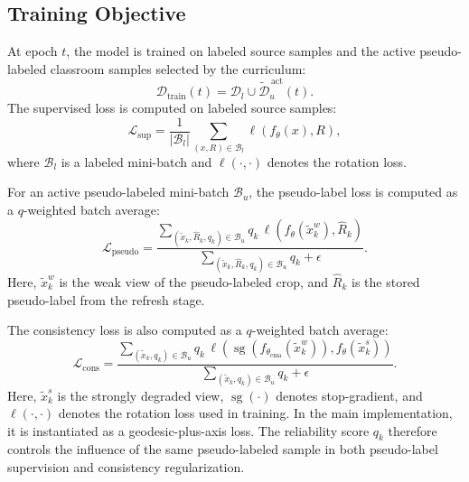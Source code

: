 \documentclass[preprint,12pt]{elsarticle}
\begin{document}
\subsection{Training Objective}
\label{sec:training_objective}

At epoch $t$, the model is trained on labeled source samples and the active pseudo-labeled classroom samples selected by the curriculum:
\begin{equation}
\mathcal{D}_{\mathrm{train}}(t)
=
\mathcal{D}_l
\cup
\tilde{\mathcal{D}}_u^{\,\mathrm{act}}(t).
\label{eq:trainset}
\end{equation}
The supervised loss is computed on labeled source samples:
\begin{equation}
\mathcal{L}_{\mathrm{sup}}
=
\frac{1}{|\mathcal{B}_l|}
\sum_{(x,R)\in\mathcal{B}_l}
\ell(f_\theta(x),R),
\label{eq:sup_loss}
\end{equation}
where $\mathcal{B}_l$ is a labeled mini-batch and $\ell(\cdot,\cdot)$ denotes the rotation loss.

For an active pseudo-labeled mini-batch $\mathcal{B}_u$, the pseudo-label loss is computed as a $q$-weighted batch average:
\begin{equation}
\mathcal{L}_{\mathrm{pseudo}}
=
\frac{
\sum_{(\tilde{x}_k,\hat{R}_k,q_k)\in\mathcal{B}_u}
q_k\,
\ell\left(f_\theta(\tilde{x}_k^{w}),\hat{R}_k\right)
}{
\sum_{(\tilde{x}_k,\hat{R}_k,q_k)\in\mathcal{B}_u} q_k+\epsilon
}.
\label{eq:pseudo_loss}
\end{equation}
Here, $\tilde{x}_k^{w}$ is the weak view of the pseudo-labeled crop, and $\hat{R}_k$ is the stored pseudo-label from the refresh stage.

The consistency loss is also computed as a $q$-weighted batch average:
\begin{equation}
\mathcal{L}_{\mathrm{cons}}
=
\frac{
\sum_{(\tilde{x}_k,q_k)\in\mathcal{B}_u}
q_k\,
\ell\left(
\operatorname{sg}\left(f_{\theta_{\mathrm{ema}}}(\tilde{x}_k^{w})\right),
f_\theta(\tilde{x}_k^{s})
\right)
}{
\sum_{(\tilde{x}_k,q_k)\in\mathcal{B}_u} q_k+\epsilon
}.
\label{eq:cons_loss}
\end{equation}
Here, $\tilde{x}_k^{s}$ is the strongly degraded view, $\operatorname{sg}(\cdot)$ denotes stop-gradient, and $\ell(\cdot,\cdot)$ denotes the rotation loss used in training. In the main implementation, it is instantiated as a geodesic-plus-axis loss. The reliability score $q_k$ therefore controls the influence of the same pseudo-labeled sample in both pseudo-label supervision and consistency regularization.
\end{document}
